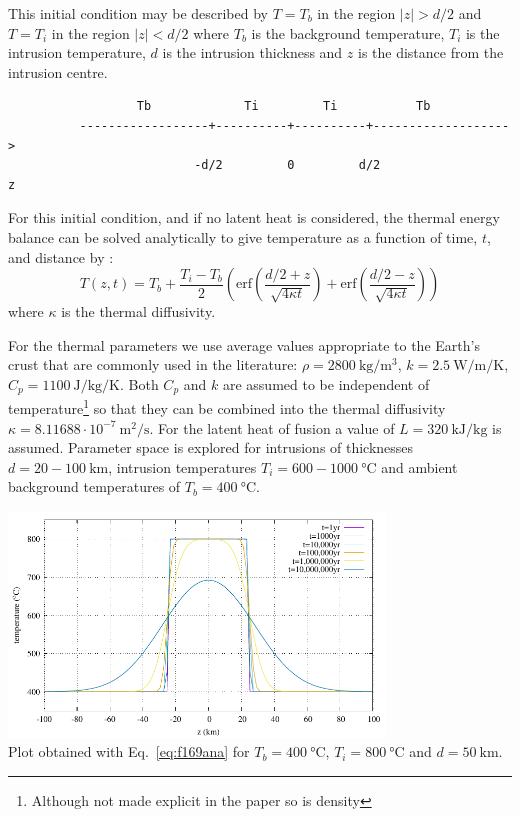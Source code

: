 This initial condition may be described by $T=T_b$ in the region
$|z|>d/2$ and $T=T_i$ in the region $|z|<d/2$
where $T_b$ is the background temperature,
$T_i$ is the intrusion temperature, $d$ is the intrusion
thickness and $z$ is the distance from the intrusion centre. 
\begin{small}
\begin{verbatim}
                  Tb             Ti         Ti           Tb
          ------------------+----------+----------+-------------------> 
                          -d/2         0         d/2                  z
\end{verbatim}
\end{small}

For this initial condition, and if no latent
heat is considered, the thermal energy balance
can be solved analytically to give temperature as
a function of time, $t$, and distance by \cite{jaeg64}:
\begin{equation}
T(z,t)=T_b + \frac{T_i-T_b}{2} 
\left(
\text{erf} \left( \frac{d/2 +z}{\sqrt{4\kappa t}} \right)
+
\text{erf} \left( \frac{d/2 -z}{\sqrt{4\kappa t}} \right)
\right)
\label{eq:f169ana}
\end{equation}
where $\kappa$ is the thermal diffusivity.


For the thermal parameters we use average
values appropriate to the Earth's crust that are
commonly used in the literature:
$\rho=2800~\si{\kg\per\cubic\meter}$, $k=2.5~\si{\watt\per\meter\per\kelvin}$, $C_p=1100~\si{\joule\per\kg\per\kelvin}$.
Both $C_p$ and $k$ are assumed to be independent of
temperature\footnote{Although not made explicit in the 
paper so is density} 
so that they can be combined into the thermal 
diffusivity $\kappa=8.11688\cdot10^{-7}~\si{\square\meter\per\second}$.
For the latent heat of fusion a value
of $L = 320~\si{\kilo\joule\per\kg}$ is assumed. Parameter space
is explored for intrusions of thicknesses $d = 20 - 100~\si{\km}$, 
intrusion temperatures $T_i = 600-1000~\si{\celsius}$
and ambient background temperatures of $T_b =400~\si{\celsius}$. 


\begin{center}
\includegraphics[width=10cm]{python_codes/fieldstone_169/images/solution.pdf}\\
{\captionfont Plot obtained 
with Eq.~\eqref{eq:f169ana}
for $T_b=400~\si{\celsius}$, $T_i=800~\si{\celsius}$ and $d=50~\si{\km}$.}
\end{center}


